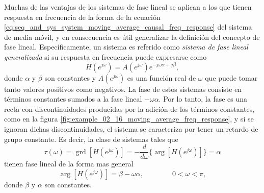 \documentclass[a4paper]{report}
\DeclareMathOperator{\grd}{grd}
\begin{document}
Muchas de las ventajas de los sistemas de fase lineal se aplican a los que tienen respuesta en frecuencia de la forma de la ecuación \ref{eq:seq_and_sys_system_moving_average_causal_freq_response} del sistema de media móvil, y en consecuencia es útil generalizar la definición del concepto de fase lineal. Específicamente, un sistema es referido como \emph{sistema de fase lineal generalizada} si su respuesta en frecuencia puede expresarse como
\begin{equation}\label{eq:transform_analysis_generalizaed_lineal_phase_system_freq_response}
 H(e^{j\omega})=A(e^{j\omega})e^{-j\omega\alpha+j\beta}, 
\end{equation}
donde \(\alpha\) y \(\beta\) son constantes y \(A(e^{j\omega})\) es una función real de \(\omega\) que puede tomar tanto valores positivos como negativos. La fase de estos sistemas consiste en términos constantes sumados a la fase lineal \(-\omega\alpha\). Por lo tanto, la fase es una recta con discontinuidades producidas por la adición de los términos constantes, como en la figura \ref{fig:example_02_16_moving_average_freq_response}, y si se ignoran dichas discontinuidades, el sistema se caracteriza por tener un retardo de grupo constante. Es decir, la clase de sistemas tales que
\[
 \tau(\omega)=\grd[H(e^{j\omega})]=-\frac{d}{d\omega}\{\arg[H(e^{j\omega})]\}=\alpha
\]
tienen fase lineal de la forma mas general
\[
 \arg[H(e^{j\omega})]=\beta-\omega\alpha,
 \qquad\qquad
 0<\omega<\pi,
\]
donde \(\beta\) y \(\alpha\) son constantes.
\end{document}
